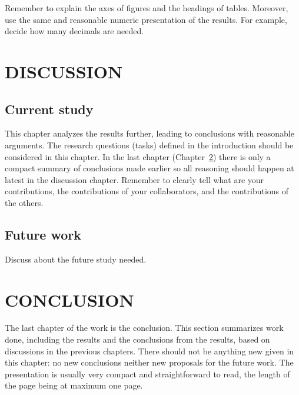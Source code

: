 \documentclass{lutmscthesis}[2017/10/03]
\begin{document}
Remember to explain the axes of figures and the headings of tables. Moreover, use the same and reasonable numeric presentation of the results. For example, decide how many decimals are needed. 

\section{DISCUSSION}
\label{sec:discussion}

\subsection{Current study}

This chapter analyzes the results further, leading to conclusions with reasonable arguments. 
The research questions (tasks) defined in the introduction should be considered in this chapter. 
In the last chapter (Chapter~\ref{sec:conclusion}) there is only a compact summary of conclusions made earlier 
so all reasoning should happen at latest in the discussion chapter. 
Remember to clearly tell what are your contributions, 
the contributions of your collaborators, and the contributions of the others. 

\subsection{Future work}

Discuss about the future study needed.

\section{CONCLUSION}
\label{sec:conclusion}

The last chapter of the work is the conclusion. 
This section summarizes work done, including the results and the conclusions from the results, 
based on discussions in the previous chapters. 
There should not be anything new given in this chapter: 
no new conclusions neither new proposals for the future work.
The presentation is usually very compact and straightforward to read, 
the length of the page being at maximum one page.   
 
\clearpage



\end{document}

